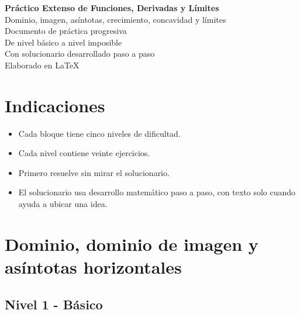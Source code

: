 \documentclass[11pt,a4paper]{article}
\begin{document}
\begin{titlepage}
\centering
\vspace*{2cm}
{\Huge\bfseries Práctico Extenso de Funciones, Derivadas y Límites\\[0.4cm]}
{\Large Dominio, imagen, asíntotas, crecimiento, concavidad y límites\\[1cm]}
\vfill
{\large Documento de práctica progresiva\\}
{\large De nivel básico a nivel imposible\\[0.5cm]}
{\large Con solucionario desarrollado paso a paso\\}
\vfill
{\large Elaborado en \LaTeX\\}
\end{titlepage}
\tableofcontents
\newpage
\section*{Indicaciones}
\begin{itemize}
\item Cada bloque tiene cinco niveles de dificultad.
\item Cada nivel contiene veinte ejercicios.
\item Primero resuelve sin mirar el solucionario.
\item El solucionario usa desarrollo matemático paso a paso, con texto solo cuando ayuda a ubicar una idea.
\end{itemize}
\newpage
\section{Dominio, dominio de imagen y asíntotas horizontales}

\subsection{Nivel 1 - Básico}
\end{document}
